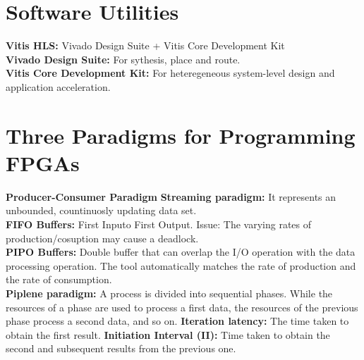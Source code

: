 \documentclass{article}
\newcommand\tab[1][1cm]{\hspace*{#1}}
\begin{document}
    \section{Software Utilities}

  \textbf{Vitis HLS:} Vivado Design Suite + Vitis Core Development Kit\\
  \textbf{Vivado Design Suite:} For sythesis, place and route.\\
  \textbf{Vitis Core Development Kit:} For heteregeneous system-level design and application acceleration.\\

  \section{Three Paradigms for Programming FPGAs}

  \textbf{Producer-Consumer Paradigm}
  \textbf{Streaming paradigm:} It represents an unbounded, countinuosly updating data set.\\
  \tab \textbf{FIFO Buffers:} First Inputo First Output. Issue: The varying rates of production/cosuption may cause a deadlock.\\
  \tab \textbf{PIPO Buffers:} Double buffer that can overlap the I/O operation with the data processing operation. The tool automatically matches the rate of production and the rate of consumption.\\
  \textbf{Piplene paradigm:} A process is divided into sequential phases. While the resources of a phase are used to process a first data, the resources of the previous phase process a second data, and so on.
  \tab \textbf{Iteration latency:} The time taken to obtain the first result.
  \tab \textbf{Initiation Interval (II):}  Time taken to obtain the second and subsequent results from the previous one.
\end{document}

